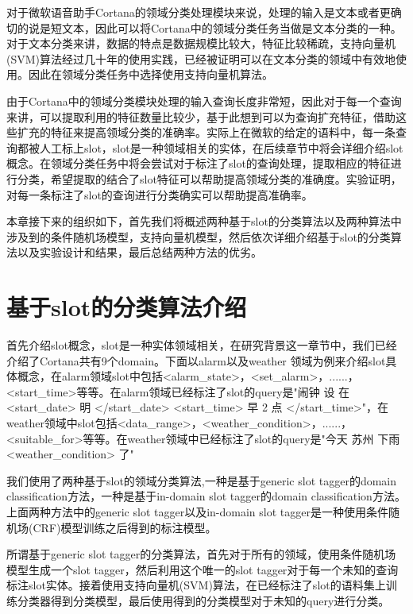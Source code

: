 \documentclass[master]{njuthesis}
\begin{document}
    对于微软语音助手Cortana的领域分类处理模块来说，处理的输入是文本或者更确切的说是短文本，因此可以将Cortana中的领域分类任务当做是文本分类的一种。对于文本分类来讲，数据的特点是数据规模比较大，特征比较稀疏，支持向量机(SVM)算法经过几十年的使用实践，已经被证明可以在文本分类的领域中有效地使用。因此在领域分类任务中选择使用支持向量机算法。
    
    由于Cortana中的领域分类模块处理的输入查询长度非常短，因此对于每一个查询来讲，可以提取利用的特征数量比较少，基于此想到可以为查询扩充特征，借助这些扩充的特征来提高领域分类的准确率。实际上在微软的给定的语料中，每一条查询都被人工标上slot，slot是一种领域相关的实体，在后续章节中将会详细介绍slot概念。在领域分类任务中将会尝试对于标注了slot的查询处理，提取相应的特征进行分类，希望提取的结合了slot特征可以帮助提高领域分类的准确度。实验证明，对每一条标注了slot的查询进行分类确实可以帮助提高准确率。
    
    本章接下来的组织如下，首先我们将概述两种基于slot的分类算法以及两种算法中涉及到的条件随机场模型，支持向量机模型，然后依次详细介绍基于slot的分类算法以及实验设计和结果，最后总结两种方法的优劣。

    
\section{基于slot的分类算法介绍}
   
    首先介绍slot概念，slot是一种实体领域相关，在研究背景这一章节中，我们已经介绍了Cortana共有9个domain。下面以alarm以及weather 领域为例来介绍slot具体概念，在alarm领域slot中包括<alarm\_state>，<set\_alarm>，......，<start\_time>等等。在alarm领域已经标注了slot的query是"闹钟 设 在 <start\_date> 明 </start\_date> <start\_time> 早 2 点 </start\_time>"，在weather领域中slot包括<data\_range>，<weather\_condition>，......，<suitable\_for>等等。在weather领域中已经标注了slot的query是"今天 苏州 下雨 <weather\_condition> 了"

    我们使用了两种基于slot的领域分类算法,一种是基于generic slot tagger的domain classification方法，一种是基于in-domain slot tagger的domain classification方法。上面两种方法中的generic slot tagger以及in-domain slot tagger是一种使用条件随机场(CRF)模型训练之后得到的标注模型。
    
    所谓基于generic slot tagger的分类算法，首先对于所有的领域，使用条件随机场模型生成一个slot tagger，然后利用这个唯一的slot tagger对于每一个未知的查询标注slot实体。接着使用支持向量机(SVM)算法，在已经标注了slot的语料集上训练分类器得到分类模型，最后使用得到的分类模型对于未知的query进行分类。
\end{document}
